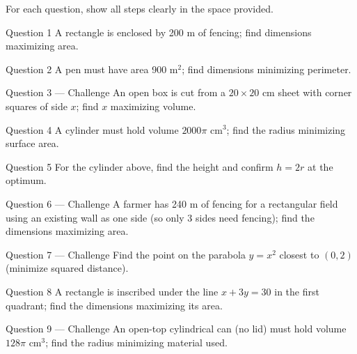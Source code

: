 \documentclass[11pt]{article}
\begin{document}
\clearpage
{}
For each question, show all steps clearly in the space provided.

\begin{qbox}{Question 1}
A rectangle is enclosed by 200 m of fencing; find dimensions maximizing area.\workspace{2.4cm}
\end{qbox}

\begin{qbox}{Question 2}
A pen must have area 900 m$^2$; find dimensions minimizing perimeter.\workspace{2.4cm}
\end{qbox}

\begin{qbox}{Question 3 --- Challenge}
An open box is cut from a $20\times20$ cm sheet with corner squares of side $x$; find $x$ maximizing volume.\workspace{3.4cm}
\end{qbox}

\begin{qbox}{Question 4}
A cylinder must hold volume $2000\pi$ cm$^3$; find the radius minimizing surface area.\workspace{2.4cm}
\end{qbox}

\begin{qbox}{Question 5}
For the cylinder above, find the height and confirm $h=2r$ at the optimum.\workspace{2.4cm}
\end{qbox}

\begin{qbox}{Question 6 --- Challenge}
A farmer has 240 m of fencing for a rectangular field using an existing wall as one side (so only 3 sides need fencing); find the dimensions maximizing area.\workspace{3.4cm}
\end{qbox}

\begin{qbox}{Question 7 --- Challenge}
Find the point on the parabola $y=x^2$ closest to $(0,2)$ (minimize squared distance).\workspace{3.4cm}
\end{qbox}

\begin{qbox}{Question 8}
A rectangle is inscribed under the line $x+3y=30$ in the first quadrant; find the dimensions maximizing its area.\workspace{2.4cm}
\end{qbox}

\begin{qbox}{Question 9 --- Challenge}
An open-top cylindrical can (no lid) must hold volume $128\pi$ cm$^3$; find the radius minimizing material used.\workspace{3.2cm}
\end{qbox}
\end{document}

